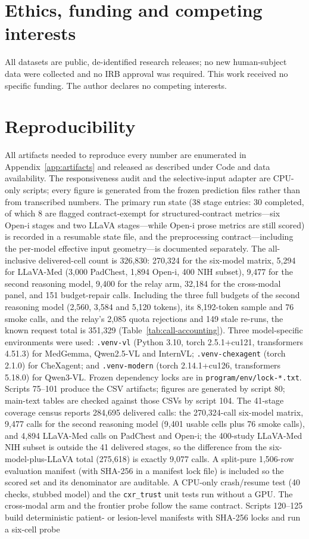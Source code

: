 \section*{Ethics, funding and competing interests}

All datasets are public, de-identified research releases; no new human-subject data were
collected and no IRB approval was required. This work received no specific funding. The
author declares no competing interests.

\section*{Reproducibility}

All artifacts needed to reproduce every number are enumerated in Appendix~\ref{app:artifacts} and released as described under Code and data availability. The responsiveness audit and the selective-input adapter are CPU-only scripts; every figure is generated from the frozen prediction files rather than from transcribed numbers. The primary run state (38 stage entries: 30 completed, of which 8 are flagged contract-exempt for structured-contract metrics---six Open-i stages and two LLaVA stages---while Open-i prose metrics are still scored) is recorded in a resumable state file, and the preprocessing contract---including the per-model effective input geometry---is documented separately. The all-inclusive delivered-cell count is 326,830: 270,324 for the six-model matrix, 5,294 for LLaVA-Med (3,000 PadChest, 1,894 Open-i, 400 NIH subset), 9,477 for the second reasoning model, 9,400 for the relay arm, 32,184 for the cross-modal panel, and 151 budget-repair calls. Including the three full budgets of the second reasoning model (2,560, 3,584 and 5,120 tokens), its 8,192-token sample and 76 smoke calls, and the relay's 2,085 quota rejections and 149 stale re-runs, the known request total is 351,329 (Table~\ref{tab:call-accounting}). Three model-specific environments were used: \texttt{.venv-vl} (Python 3.10, torch 2.5.1+cu121, transformers 4.51.3) for MedGemma, Qwen2.5-VL and InternVL; \texttt{.venv-chexagent} (torch 2.1.0) for CheXagent; and \texttt{.venv-modern} (torch 2.14.1+cu126, transformers 5.18.0) for Qwen3-VL. Frozen dependency locks are in \texttt{program/env/lock-*.txt}. Scripts 75--101 produce the CSV artifacts; figures are generated by script 80; main-text tables are checked against those CSVs by script 104. The 41-stage coverage census reports 284,695 delivered calls: the 270,324-call six-model matrix, 9,477 calls for the second reasoning model (9,401 usable cells plus 76 smoke calls), and 4,894 LLaVA-Med calls on PadChest and Open-i; the 400-study LLaVA-Med NIH subset is outside the 41 delivered stages, so the difference from the six-model-plus-LLaVA total (275,618) is exactly 9,077 calls. A split-pure 1,506-row evaluation manifest (with SHA-256 in a manifest lock file) is included so the scored set and its denominator are auditable. A CPU-only crash/resume test (40 checks, stubbed model) and the \texttt{cxr\_trust} unit tests run without a GPU. The cross-modal arm and the frontier probe follow the same contract. Scripts 120--125 build deterministic patient- or lesion-level manifests with SHA-256 locks and run a six-cell probe 